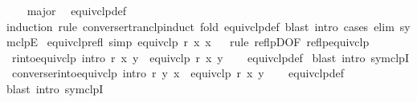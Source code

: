 \begin{isabellebody}
\ \ %
\endisadelimproof
%
\isatagproof
{}\isamarkupfalse%
\ major\ \isamarkupfalse%
\ equivclp{\isacharunderscore}{\kern0pt}def\isanewline
\ \ \isamarkupfalse%
{\isacharparenleft}{\kern0pt}induction\ rule{\isacharcolon}{\kern0pt}\ converse{\isacharunderscore}{\kern0pt}rtranclp{\isacharunderscore}{\kern0pt}induct{\isacharsemicolon}{\kern0pt}\ fold\ equivclp{\isacharunderscore}{\kern0pt}def{\isacharsemicolon}{\kern0pt}\ blast\ intro{\isacharcolon}{\kern0pt}\ cases\ elim{\isacharcolon}{\kern0pt}\ symclpE{\isacharparenright}{\kern0pt}%
\endisatagproof
{\isafoldproof}%
%
\isadelimproof
\isanewline
%
\endisadelimproof
\isanewline
{}\isamarkupfalse%
\ equivclp{\isacharunderscore}{\kern0pt}refl\ {\isacharbrackleft}{\kern0pt}simp{\isacharbrackright}{\kern0pt}{\isacharcolon}{\kern0pt}\ {\isachardoublequoteopen}equivclp\ r\ x\ x{\isachardoublequoteclose}\isanewline
%
\isadelimproof
\ \ %
\endisadelimproof
%
\isatagproof
{}\isamarkupfalse%
{\isacharparenleft}{\kern0pt}rule\ reflpD{\isacharbrackleft}{\kern0pt}OF\ reflp{\isacharunderscore}{\kern0pt}equivclp{\isacharbrackright}{\kern0pt}{\isacharparenright}{\kern0pt}%
\endisatagproof
{\isafoldproof}%
%
\isadelimproof
\isanewline
%
\endisadelimproof
\isanewline
{}\isamarkupfalse%
\ r{\isacharunderscore}{\kern0pt}into{\isacharunderscore}{\kern0pt}equivclp\ {\isacharbrackleft}{\kern0pt}intro{\isacharbrackright}{\kern0pt}{\isacharcolon}{\kern0pt}\ {\isachardoublequoteopen}r\ x\ y\ {\isasymLongrightarrow}\ equivclp\ r\ x\ y{\isachardoublequoteclose}\isanewline
%
\isadelimproof
\ \ %
\endisadelimproof
%
\isatagproof
{}\isamarkupfalse%
\ equivclp{\isacharunderscore}{\kern0pt}def\ \isamarkupfalse%
{\isacharparenleft}{\kern0pt}blast\ intro{\isacharcolon}{\kern0pt}\ symclpI{\isacharparenright}{\kern0pt}%
\endisatagproof
{\isafoldproof}%
%
\isadelimproof
\isanewline
%
\endisadelimproof
\isanewline
{}\isamarkupfalse%
\ converse{\isacharunderscore}{\kern0pt}r{\isacharunderscore}{\kern0pt}into{\isacharunderscore}{\kern0pt}equivclp\ {\isacharbrackleft}{\kern0pt}intro{\isacharbrackright}{\kern0pt}{\isacharcolon}{\kern0pt}\ {\isachardoublequoteopen}r\ y\ x\ {\isasymLongrightarrow}\ equivclp\ r\ x\ y{\isachardoublequoteclose}\isanewline
%
\isadelimproof
\ \ %
\endisadelimproof
%
\isatagproof
{}\isamarkupfalse%
\ equivclp{\isacharunderscore}{\kern0pt}def\ \isamarkupfalse%
{\isacharparenleft}{\kern0pt}blast\ intro{\isacharcolon}{\kern0pt}\ symclpI{\isacharparenright}{\kern0pt}%

\end{isabellebody}

